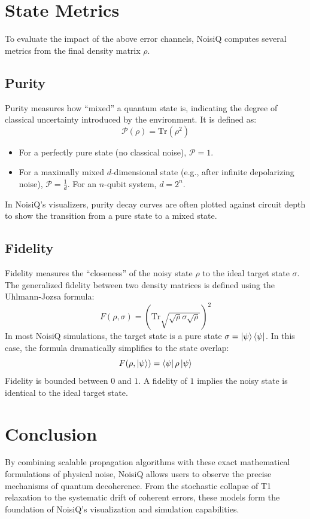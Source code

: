 \documentclass[11pt, a4paper]{article}
\begin{document}
\section{State Metrics}

To evaluate the impact of the above error channels, NoisiQ computes several metrics from the final density matrix $\rho$.

\subsection{Purity}
Purity measures how ``mixed'' a quantum state is, indicating the degree of classical uncertainty introduced by the environment. It is defined as:
\begin{equation}
    \mathcal{P}(\rho) = \text{Tr}(\rho^2)
\end{equation}
\begin{itemize}
    \item For a perfectly pure state (no classical noise), $\mathcal{P} = 1$.
    \item For a maximally mixed $d$-dimensional state (e.g., after infinite depolarizing noise), $\mathcal{P} = \frac{1}{d}$. For an $n$-qubit system, $d = 2^n$.
\end{itemize}
In NoisiQ's visualizers, purity decay curves are often plotted against circuit depth to show the transition from a pure state to a mixed state.

\subsection{Fidelity}
Fidelity measures the ``closeness'' of the noisy state $\rho$ to the ideal target state $\sigma$. The generalized fidelity between two density matrices is defined using the Uhlmann-Jozsa formula:
\begin{equation}
    F(\rho, \sigma) = \left( \text{Tr} \sqrt{\sqrt{\rho} \sigma \sqrt{\rho}} \right)^2
\end{equation}
In most NoisiQ simulations, the target state is a pure state $\sigma = \ket{\psi}\bra{\psi}$. In this case, the formula dramatically simplifies to the state overlap:
\begin{equation}
    F(\rho, \ket{\psi}) = \bra{\psi} \rho \ket{\psi}
\end{equation}
Fidelity is bounded between $0$ and $1$. A fidelity of $1$ implies the noisy state is identical to the ideal target state.

\section{Conclusion}
By combining scalable propagation algorithms with these exact mathematical formulations of physical noise, NoisiQ allows users to observe the precise mechanisms of quantum decoherence. From the stochastic collapse of T1 relaxation to the systematic drift of coherent errors, these models form the foundation of NoisiQ's visualization and simulation capabilities.
\end{document}
